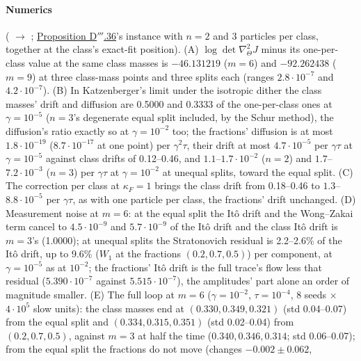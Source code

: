 \begin{sloppypar}
\paragraph{Numerics} ( $\to$ ;
\hyperref[res:thmDppp:36]{Proposition D$'''$.36}'s instance with $n = 2$ and 3 particles per class, together at the
class's exact-fit position). (A) $\log\det\nabla^2_\Theta J$ minus its one-per-class value at the same class masses is
$-46.131219$ ($m = 6$) and $-92.262438$ ($m = 9$) at three class-mass points and three splits each (ranges
$2.8\cdot10^{-7}$ and $4.2\cdot10^{-7}$). (B) In Katzenberger's limit under the isotropic dither the class masses'
drift and diffusion are 0.5000 and 0.3333 of the one-per-class ones at $\gamma = 10^{-5}$ ($n = 3$'s degenerate equal
split included, by the Schur method), the diffusion's ratio exactly so at $\gamma = 10^{-2}$ too; the fractions'
diffusion is at most $1.8\cdot10^{-19}$ ($8.7\cdot10^{-17}$ at one point) per $\gamma^2\tau$, their drift at most
$4.7\cdot10^{-5}$ per $\gamma\tau$ at $\gamma = 10^{-5}$ against class drifts of 0.12--0.46, and
$1.1$--$1.7\cdot10^{-2}$ ($n = 2$) and $1.7$--$7.2\cdot10^{-3}$ ($n = 3$) per $\gamma\tau$ at $\gamma = 10^{-2}$ at
unequal splits, toward the equal split. (C) The correction per class at $\kappa_F = 1$ brings the class drift from
0.18--0.46 to $1.3$--$8.8\cdot10^{-5}$ per $\gamma\tau$, as with one particle per class, the fractions' drift
unchanged. (D) Measurement noise at $m = 6$: at the equal split the It\^o drift and the Wong--Zakai term cancel to
$4.5\cdot10^{-9}$ and $5.7\cdot10^{-9}$ of the It\^o drift and the class It\^o drift is $m = 3$'s (1.0000); at unequal
splits the Stratonovich residual is 2.2--2.6\% of the It\^o drift, up to 9.6\% ($W_1$ at the fractions
$(0.2, 0.7, 0.5)$) per component, at $\gamma = 10^{-5}$ as at $10^{-2}$; the fractions' It\^o drift is the full trace's
flow less that residual ($5.390\cdot10^{-7}$ against $5.515\cdot10^{-7}$), the amplitudes' part alone an order of
magnitude smaller. (E) The full loop at $m = 6$ ($\gamma = 10^{-2}$, $\tau = 10^{-4}$, 8 seeds $\times$ $4\cdot10^5$
slow units): the class masses end at $(0.330, 0.349, 0.321)$ (std 0.04--0.07) from the equal split and
$(0.334, 0.315, 0.351)$ (std 0.02--0.04) from $(0.2, 0.7, 0.5)$, against $m = 3$ at half the time
($0.340, 0.346, 0.314$; std 0.06--0.07); from the equal split the fractions do not move (changes $-0.002\pm0.062$,

\end{sloppypar}
